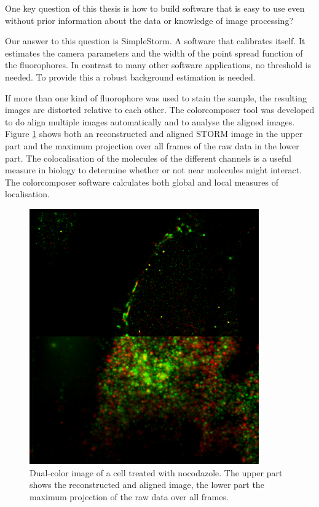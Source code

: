One key question of this thesis is how to build software that is easy to use even without prior information about the data or knowledge of image processing? \newline

Our answer to this question is SimpleStorm. A software that calibrates itself. It estimates the camera parameters and the width of the point spread function of the fluorophores. In contrast to many other software applications, no threshold is needed. To provide this a robust background estimation is needed.\newline

If more than one kind of fluorophore was used to stain the sample, the resulting images are distorted relative to each other. The colorcomposer tool was developed to do align multiple images automatically and to analyse the aligned images. Figure \ref{dualcolor} shows both an reconstructed and aligned STORM image in the upper part and the maximum projection over all frames of the raw data in the lower part. The colocalisation of the molecules of the different channels is a useful measure in biology to determine whether or not near molecules might interact. The colorcomposer software calculates both global and local measures of localisation.

\begin{figure}
\centering
\includegraphics[width = 0.88\textwidth]{pictures/alignedStormWidefield.png}
	\caption{Dual-color image of a cell treated with nocodazole. The upper part shows the reconstructed and aligned image, the lower part the maximum projection of the raw data over all frames.}
	\label{dualcolor}
\end{figure}


